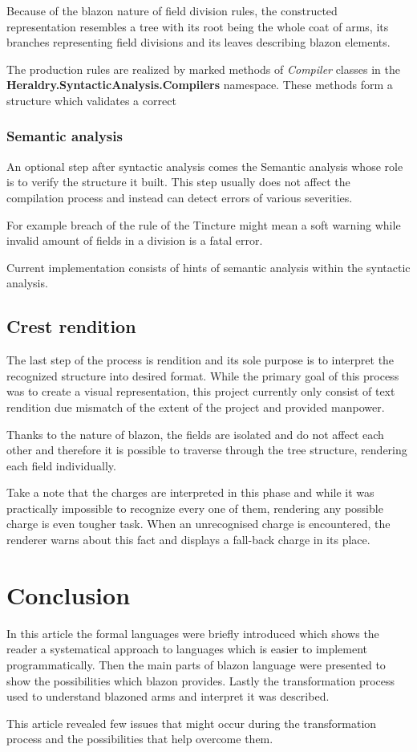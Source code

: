 \documentclass[12pt,a4paper]{article}
\let\oldsection\section
\renewcommand\section{\clearpage\oldsection}
\begin{document}
Because of the blazon nature of field division rules, the constructed representation resembles a tree with its root being the whole coat of arms, its branches representing field divisions and its leaves describing blazon elements.

The production rules are realized by marked methods of \textit{Compiler} classes in the \textbf{Heraldry.SyntacticAnalysis.Compilers} namespace. These methods form a structure which validates a correct 

\subsubsection{Semantic analysis} 
An optional step after syntactic analysis comes the Semantic analysis whose role is to verify the structure it built.
This step usually does not affect the compilation process and instead can detect errors of various severities.

For example breach of the rule of the Tincture might mean a soft warning while invalid amount of fields in a division is a fatal error.

Current implementation consists of hints of semantic analysis within the syntactic analysis.

\subsection{Crest rendition}
The last step of the process is rendition and its sole purpose is to interpret the recognized structure into desired format.
While the primary goal of this process was to create a visual representation, this project currently only consist of text rendition due mismatch of the extent of the project and provided manpower.

Thanks to the nature of blazon, the fields are isolated and do not affect each other and therefore it is possible to traverse through the tree structure, rendering each field individually.

Take a note that the charges are interpreted in this phase and while it was practically impossible to recognize every one of them, rendering any possible charge is even tougher task.
When an unrecognised charge is encountered, the renderer warns about this fact and displays a fall-back charge in its place.

\section{Conclusion}
In this article the formal languages were briefly introduced which shows the reader a systematical approach to languages which is easier to implement programmatically.
Then the main parts of blazon language were presented to show the possibilities which blazon provides.
Lastly the transformation process used to understand blazoned arms and interpret it was described.

This article revealed few issues that might occur during the transformation process and the possibilities that help overcome them.



{\raggedright\small
	
}

\end{document}

